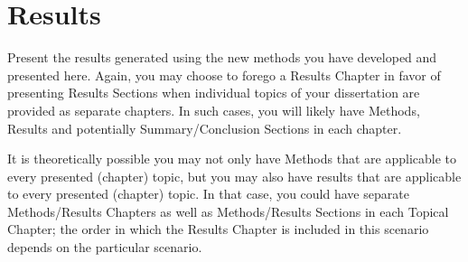 \chapter{Results}\label{chap:results}

Present the results generated using the new methods you have developed and presented here. Again, you may choose to forego a Results Chapter in favor of presenting Results Sections when individual topics of your dissertation are provided as separate chapters. In such cases, you will likely have Methods, Results and potentially Summary/Conclusion Sections in each chapter.

It is theoretically possible you may not only have Methods that are applicable to every presented (chapter) topic, but you may also have results that are applicable to every presented (chapter) topic. In that case, you could have separate Methods/Results Chapters as well as Methods/Results Sections in each Topical Chapter; the order in which the Results Chapter is included in this scenario depends on the particular scenario.

\endinput

